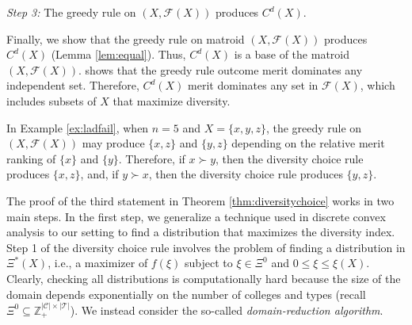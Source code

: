 \documentclass[12pt]{amsart}
\theoremstyle{remark}
\begin{document}
\medskip
\noindent
\emph{Step 3:} The greedy rule on $(X,\mathcal{F}(X))$ produces $C^d(X)$.

Finally, we show that the greedy rule on matroid $(X,\mathcal{F}(X))$ produces
$C^d(X)$ (Lemma \ref{lem:equal}). Thus, $C^d(X)$ is a base of the matroid $(X,\mathcal{F}(X))$.
\cite{gale1968} shows that the greedy rule outcome merit dominates any independent set.
Therefore, $C^d(X)$ merit dominates any set in $\mathcal{F}(X)$, which includes
subsets of $X$ that maximize diversity.

In Example \ref{ex:ladfail}, when $n=5$ and $X=\{x,y,z\}$, the greedy rule on
$(X,\mathcal{F}(X))$ may produce $\{x,z\}$ and $\{y,z\}$ depending on the relative
merit ranking of $\{x\}$ and $\{y\}$. Therefore, if $x\succ y$, then the diversity
choice rule produces $\{x,z\}$, and, if $y\succ x$, then the diversity choice
rule produces $\{y,z\}$.

\medskip

The proof of the third statement in Theorem \ref{thm:diversitychoice} works in
two main steps. In the first step, we generalize a technique used in discrete convex
analysis
to our setting to find a distribution that maximizes the diversity index.
Step 1 of the diversity choice rule involves the problem of finding a distribution in
$\Xi^*(X)$, i.e., a maximizer of $f(\xi)$ subject to $\xi\in \Xi^0$ and
$0\leq \xi\leq \xi(X)$. Clearly, checking all distributions is computationally hard
because the size of the domain depends exponentially on the number of colleges and
types (recall $\Xi^0\subseteq \mathbb{Z}^{|\mathcal{C}|\times |\mathcal{T}|}_+$). 
We instead consider the so-called {\it domain-reduction algorithm}.
\end{document}
